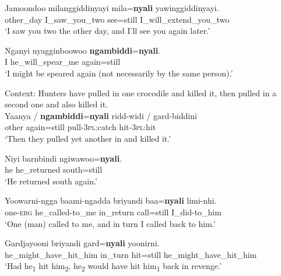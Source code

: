 \begin{exe}
	\ex\label{exAppendixGooniyandiIterative1}
	 \gll Jamoondoo milanggiddinyayi mila=\textbf{nyali} yawinggiddinyayi.\\
	other\_day I\_saw\_you\_two see=still I\_will\_extend\_you\_two\\
	\glt \lq I saw you two the other day, and I’ll see you again later.\rq{ }\parencite[460]{McGregor1990}
	
	\ex\label{exAppendixGooniyandiIterative3}
	\gll Nganyi nyagginboowoo \textbf{ngambiddi}=\textbf{nyali}.\\
	I he\_will\_spear\_me again=still\\
	\glt \lq I might be speared again (not necessarily by the same person).' \parencite[462]{McGregor1990}
	
	\ex\label{exAppendixGooniyandiIterative4}
	Context: Hunters have pulled in one crocodile and killed it, then pulled in a second one and also killed it.\\
	\gll Yaanya / \textbf{ngambiddi}=\textbf{nyali} ridd-widi / gard-biddini\\
	other {} again=still pull-3\textsc{pl}:catch {} hit-3\textsc{pl}:hit\\
	\glt \lq Then they pulled yet another in and killed it.' \parencite[575]{McGregor1990}

	\ex\label{exAppendixGooniyandiRestitutive2}
	\gll Niyi barnbindi ngiwawoo=\textbf{nyali}.\\
	he he\_returned south=still\\
	\glt \lq He returned south again.' \parencite[460]{McGregor1990}

	\ex \label{exAppendixGooniyandiRestitutive3}
	\gll Yoowarni-ngga baami-ngadda briyandi baa=\textbf{nyali} limi-nhi.\\
	one-\textsc{erg} he\_called-to\_me in\_return call=still I\_did-to\_him\\
	\glt \lq One (man) called to me, and in turn I called back to him.\rq{ }\parencite[461]{McGregor1990}

	\ex \label{exAppendixGooniyandiRestitutive4}
	\gll Gardjayooni briyandi gard=\textbf{nyali} yoonirni.\\
	he\_might\_have\_hit\_him in\_turn hit=still he\_might\_have\_hit\_him\\
	\glt \lq Had he\textsubscript{1} hit him\textsubscript{2}, he\textsubscript{2} would have hit him\textsubscript{1} back in revenge.' \parencite[461]{McGregor1990}
\end{exe}

